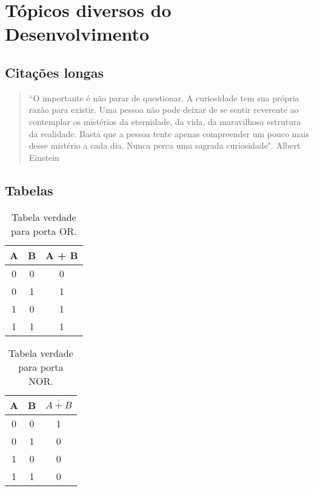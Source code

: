 

\chapter{Tópicos diversos do Desenvolvimento}
\thispagestyle{empty} %

\section{Citações longas}

\begin{flushright}
\begin{minipage}{0.75\textwidth} %
\begin{quotation}
``O importante é não parar de questionar. A curiosidade tem sua própria razão
para existir. Uma pessoa não pode deixar de se sentir reverente ao contemplar
os mistérios da eternidade, da vida, da maravilhosa estrutura da realidade. Basta
que a pessoa tente apenas compreender um pouco mais desse mistério a cada dia.
Nunca perca uma sagrada curiosidade". Albert Einstein
\end{quotation}
\end{minipage}
\end{flushright}

\section{Tabelas}

\begin{table}[h]
	\centering
		\begin{tabular}{|c|c|c|}
		  \hline
			A & B & A + B \\ \hline
			0 & 0 & 0 \\ \hline
			0 & 1 & 1 \\ \hline
			1 & 0 & 1 \\ \hline
			1 & 1 & 1 \\ \hline
		\end{tabular}
		\caption{Tabela verdade para porta OR.}
\end{table}

\begin{table}[h]
	\centering
		\begin{tabular}{|c|c|c|}
		  \hline
			A & B & $\overline{A + B}$ \\ \hline
			0 & 0 & 1 \\ \hline
			0 & 1 & 0 \\ \hline
			1 & 0 & 0 \\ \hline
			1 & 1 & 0 \\ \hline
		\end{tabular}
		\caption{Tabela verdade para porta NOR.}
\end{table}


